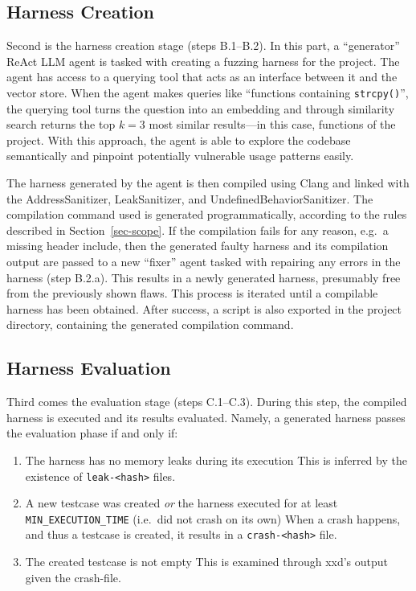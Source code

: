 \documentclass[
  a4paper,
  DIV=11,
  numbers=noendperiod]{scrreprt}
\providecommand{\tightlist}{%
  \setlength{\itemsep}{0pt}\setlength{\parskip}{0pt}}
\theoremstyle{definition}
\theoremstyle{remark}
\begin{document}
\subsection{Harness Creation}\label{sec-creation}

Second is the harness creation stage (steps B.1--B.2). In this part, a
``generator'' ReAct LLM agent is tasked with creating a fuzzing harness
for the project. The agent has access to a querying tool that acts as an
interface between it and the vector store. When the agent makes queries
like ``functions containing \texttt{strcpy()}'', the querying tool turns
the question into an embedding and through similarity search returns the
top \(k=3\) most similar results---in this case, functions of the
project. With this approach, the agent is able to explore the codebase
semantically and pinpoint potentially vulnerable usage patterns easily.

The harness generated by the agent is then compiled using Clang and
linked with the AddressSanitizer, LeakSanitizer, and
UndefinedBehaviorSanitizer. The compilation command used is generated
programmatically, according to the rules described in
Section~\ref{sec-scope}. If the compilation fails for any reason, e.g.~a
missing header include, then the generated faulty harness and its
compilation output are passed to a new ``fixer'' agent tasked with
repairing any errors in the harness (step B.2.a). This results in a
newly generated harness, presumably free from the previously shown
flaws. This process is iterated until a compilable harness has been
obtained. After success, a script is also exported in the project
directory, containing the generated compilation command.

\subsection{Harness Evaluation}\label{sec-evaluation}

Third comes the evaluation stage (steps C.1--C.3). During this step, the
compiled harness is executed and its results evaluated. Namely, a
generated harness passes the evaluation phase if and only if:

\begin{enumerate}
\def\labelenumi{\arabic{enumi}.}
\tightlist
\item
  The harness has no memory leaks during its execution This is inferred
  by the existence of \texttt{leak-\textless{}hash\textgreater{}} files.
\item
  A new testcase was created \emph{or} the harness executed for at least
  \texttt{MIN\_EXECUTION\_TIME} (i.e.~did not crash on its own) When a
  crash happens, and thus a testcase is created, it results in a
  \texttt{crash-\textless{}hash\textgreater{}} file.
\item
  The created testcase is not empty This is examined through xxd's
  output given the crash-file.
\end{enumerate}
\end{document}
